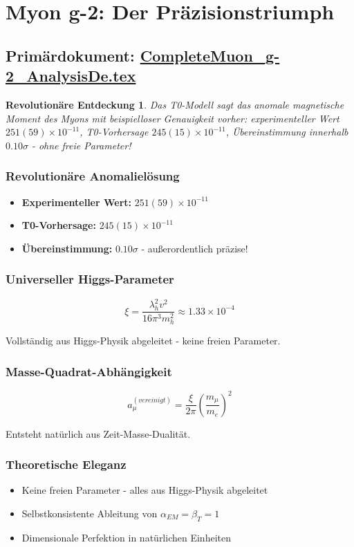 \documentclass[12pt,a4paper]{report}
\newtheorem{discovery}{Revolutionäre Entdeckung}[chapter]
\begin{document}
	\section{Myon g-2: Der Präzisionstriumph}
	\subsection{Primärdokument: \href{https://github.com/jpascher/T0-Time-Mass-Duality/tree/main/2/pdf/CompleteMuon_g-2_AnalysisDe.pdf}{CompleteMuon\_g-2\_AnalysisDe.tex}}
	
	\begin{discovery}
		Das T0-Modell sagt das anomale magnetische Moment des Myons mit beispielloser Genauigkeit vorher: experimenteller Wert $251(59)\times10^{-11}$, T0-Vorhersage $245(15)\times10^{-11}$, Übereinstimmung innerhalb $0.10\sigma$ - ohne freie Parameter!
	\end{discovery}
	
	\subsubsection{Revolutionäre Anomalielösung}
	\begin{itemize}
		\item \textbf{Experimenteller Wert:} $251(59) \times 10^{-11}$
		\item \textbf{T0-Vorhersage:} $245(15) \times 10^{-11}$
		\item \textbf{Übereinstimmung:} $0.10\sigma$ - außerordentlich präzise!
	\end{itemize}
	
	\subsubsection{Universeller Higgs-Parameter}
	$$\xi = \frac{\lambda_h^2 v^2}{16\pi^3 m_h^2} \approx 1.33 \times 10^{-4}$$
	
	Vollständig aus Higgs-Physik abgeleitet - keine freien Parameter.
	
	\subsubsection{Masse-Quadrat-Abhängigkeit}
	$$a_\mu^{(vereinigt)} = \frac{\xi}{2\pi}\left(\frac{m_\mu}{m_e}\right)^2$$
	
	Entsteht natürlich aus Zeit-Masse-Dualität.
	
	\subsubsection{Theoretische Eleganz}
	\begin{itemize}
		\item Keine freien Parameter - alles aus Higgs-Physik abgeleitet
		\item Selbstkonsistente Ableitung von $\alpha_{EM} = \beta_T = 1$
		\item Dimensionale Perfektion in natürlichen Einheiten
	\end{itemize}
	
\end{document}
